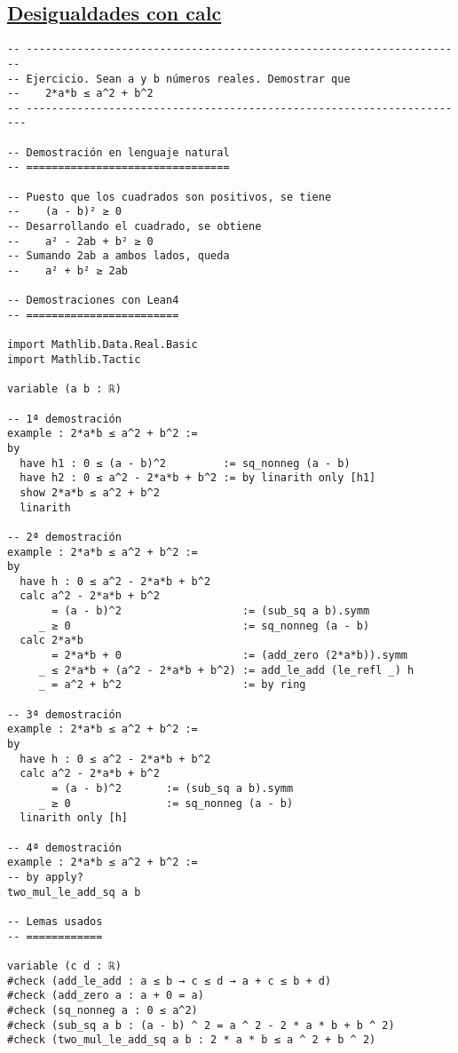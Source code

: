\subsection{\href{./src/Basicos/Desigualdades\_con\_calc.lean}{Desigualdades con calc}}
\label{sec:org92b7bb0}
\begin{verbatim}
-- ---------------------------------------------------------------------
-- Ejercicio. Sean a y b números reales. Demostrar que
--    2*a*b ≤ a^2 + b^2
-- ----------------------------------------------------------------------

-- Demostración en lenguaje natural
-- ================================

-- Puesto que los cuadrados son positivos, se tiene
--    (a - b)² ≥ 0
-- Desarrollando el cuadrado, se obtiene
--    a² - 2ab + b² ≥ 0
-- Sumando 2ab a ambos lados, queda
--    a² + b² ≥ 2ab

-- Demostraciones con Lean4
-- ========================

import Mathlib.Data.Real.Basic
import Mathlib.Tactic

variable (a b : ℝ)

-- 1ª demostración
example : 2*a*b ≤ a^2 + b^2 :=
by
  have h1 : 0 ≤ (a - b)^2         := sq_nonneg (a - b)
  have h2 : 0 ≤ a^2 - 2*a*b + b^2 := by linarith only [h1]
  show 2*a*b ≤ a^2 + b^2
  linarith

-- 2ª demostración
example : 2*a*b ≤ a^2 + b^2 :=
by
  have h : 0 ≤ a^2 - 2*a*b + b^2
  calc a^2 - 2*a*b + b^2
       = (a - b)^2                   := (sub_sq a b).symm
     _ ≥ 0                           := sq_nonneg (a - b)
  calc 2*a*b
       = 2*a*b + 0                   := (add_zero (2*a*b)).symm
     _ ≤ 2*a*b + (a^2 - 2*a*b + b^2) := add_le_add (le_refl _) h
     _ = a^2 + b^2                   := by ring

-- 3ª demostración
example : 2*a*b ≤ a^2 + b^2 :=
by
  have h : 0 ≤ a^2 - 2*a*b + b^2
  calc a^2 - 2*a*b + b^2
       = (a - b)^2       := (sub_sq a b).symm
     _ ≥ 0               := sq_nonneg (a - b)
  linarith only [h]

-- 4ª demostración
example : 2*a*b ≤ a^2 + b^2 :=
-- by apply?
two_mul_le_add_sq a b

-- Lemas usados
-- ============

variable (c d : ℝ)
#check (add_le_add : a ≤ b → c ≤ d → a + c ≤ b + d)
#check (add_zero a : a + 0 = a)
#check (sq_nonneg a : 0 ≤ a^2)
#check (sub_sq a b : (a - b) ^ 2 = a ^ 2 - 2 * a * b + b ^ 2)
#check (two_mul_le_add_sq a b : 2 * a * b ≤ a ^ 2 + b ^ 2)
\end{verbatim}

